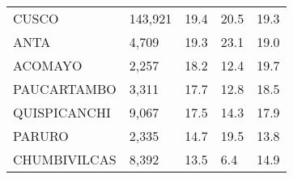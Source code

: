 \begin{tabular}{lllll}
	\cellcolor[HTML]{FF5050}CUSCO                                  & 143,921                                                               & 19.4                                                                             & 20.5                                                                        & 19.3                                                                                \\
	\cellcolor[HTML]{FF5050}ANTA                                   & 4,709                                                                 & 19.3                                                                             & 23.1                                                                        & 19.0                                                                                \\
	\cellcolor[HTML]{FF5050}ACOMAYO                                & 2,257                                                                 & 18.2                                                                             & 12.4                                                                        & 19.7                                                                                \\
	\cellcolor[HTML]{FF5050}PAUCARTAMBO                            & 3,311                                                                 & 17.7                                                                             & 12.8                                                                        & 18.5                                                                                \\
	\cellcolor[HTML]{FF5050}QUISPICANCHI                           & 9,067                                                                 & 17.5                                                                             & 14.3                                                                        & 17.9                                                                                \\
	\cellcolor[HTML]{FF5050}PARURO                                 & 2,335                                                                 & 14.7                                                                             & 19.5                                                                        & 13.8                                                                                \\
	\cellcolor[HTML]{FF5050}CHUMBIVILCAS                           & 8,392                                                                 & 13.5                                                                             & 6.4                                                                         & 14.9                                                                                \\

\end{tabular}
